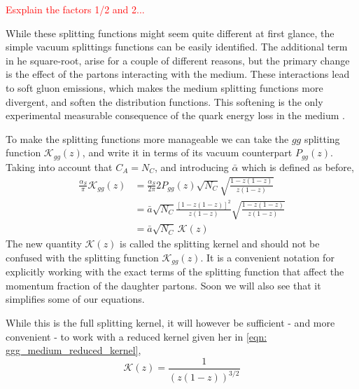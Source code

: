 \documentclass[main.tex]{subfiles}
\begin{document}
\textcolor{red}{Esxplain the factors 1/2 and 2...}

While these splitting functions might seem quite different at first glance, the simple vacuum splittings functions can be easily identified. The additional term in he square-root, arise for a couple of different reasons, but the primary change is the effect of the partons interacting with the medium. These interactions lead to soft gluon emissions, which makes the medium splitting functions more divergent, and soften the distribution functions. This softening is the only experimental measurable consequence of the quark energy loss in the medium \cite{Wang_2001_Multiple_Parton_Scattering}.

To make the splitting functions more manageable we can take the \(gg\) splitting function \(\mathcal{K}_{gg}(z)\), and write it in terms of its vacuum counterpart \(P_{gg}(z)\). Taking into account that \(C_A=N_C\), and introducing \(\bar \alpha\) which is defined as before,
\begin{align}\label{eqn: vacuumtomedium_ggg_splitting_relation}
    \frac{\alpha_S}{\pi} \mathcal{K}_{gg}(z) &= \frac{\alpha_S}{2 \pi} 2 P_{gg}(z) \sqrt{N_C} \sqrt{\frac{1-z(1-z)}{z(1-z)}} \nonumber \\
    &= \bar a \sqrt{N_C} \frac{\left[1-z(1-z)\right]^2}{z(1-z)}  \sqrt{\frac{1-z(1-z)}{z(1-z)}} \nonumber \\
    &= \bar a \sqrt{N_C} \, \mathcal{K}(z)
\end{align}
The new quantity \(\mathcal{K}(z)\) is called the splitting kernel and should not be confused with the splitting function \(\mathcal{K}_{gg}(z)\). It is a convenient  notation for explicitly working with the exact terms of the splitting function that affect the momentum fraction of the daughter partons. Soon we will also see that it simplifies some of our equations. 

While this is the full splitting kernel, it will however be sufficient - and more convenient - to work with a reduced kernel given her in \autoref{eqn: ggg_medium_reduced_kernel}, 
\begin{equation}\label{eqn: ggg_medium_reduced_kernel}
    \mathcal{K}(z) = \frac{1}{\left( z(1-z)\right)^{3/2}}
\end{equation}
\end{document}
